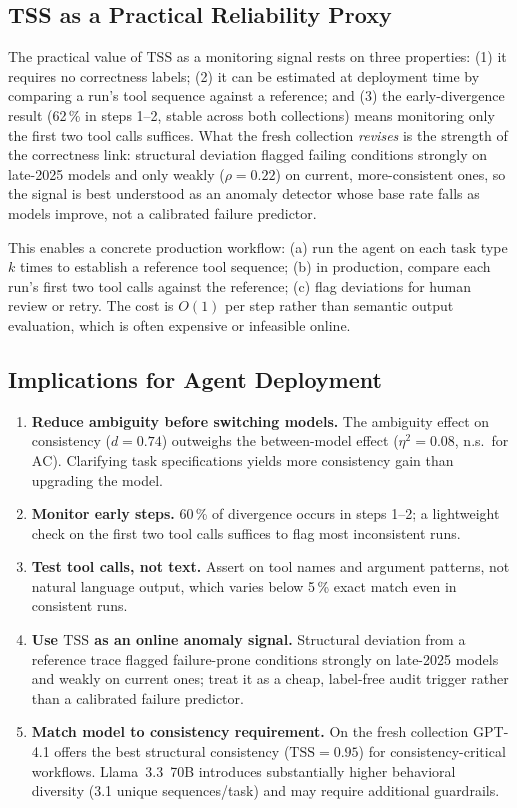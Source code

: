 \documentclass[11pt]{article}
\newcommand{\tss}{\mathrm{TSS}}
\newcommand{\ac}{\mathrm{AC}}
\begin{document}
\subsection{TSS as a Practical Reliability Proxy}
\label{sec:tss_proxy}

The practical value of $\tss$ as a monitoring signal rests on three
properties: (1) it requires no correctness labels; (2) it can be estimated at
deployment time by comparing a run's tool sequence against a reference; and
(3) the early-divergence result (62\,\% in steps 1--2, stable across both
collections) means monitoring only the first two tool calls suffices. What the
fresh collection \emph{revises} is the strength of the correctness link:
structural deviation flagged failing conditions strongly on late-2025 models
and only weakly ($\rho = 0.22$) on current, more-consistent ones, so the
signal is best understood as an anomaly detector whose base rate falls as
models improve, not a calibrated failure predictor.

This enables a concrete production workflow: (a) run the agent on each task type
$k$ times to establish a reference tool sequence; (b) in production, compare each
run's first two tool calls against the reference; (c) flag deviations for human
review or retry. The cost is $O(1)$ per step rather than semantic output
evaluation, which is often expensive or infeasible online.

\subsection{Implications for Agent Deployment}
\label{sec:implications}

\begin{enumerate}[leftmargin=1.5em]
  \item \textbf{Reduce ambiguity before switching models.} The ambiguity effect on
    consistency ($d = 0.74$) outweighs the between-model effect ($\eta^2 = 0.08$,
    n.s.\ for $\ac$). Clarifying task specifications yields more consistency gain
    than upgrading the model.
  \item \textbf{Monitor early steps.} 60\,\% of divergence occurs in steps 1--2;
    a lightweight check on the first two tool calls suffices to flag most
    inconsistent runs.
  \item \textbf{Test tool calls, not text.} Assert on tool names and argument
    patterns, not natural language output, which varies below 5\,\% exact match
    even in consistent runs.
  \item \textbf{Use $\tss$ as an online anomaly signal.} Structural deviation
    from a reference trace flagged failure-prone conditions strongly on
    late-2025 models and weakly on current ones; treat it as a cheap,
    label-free audit trigger rather than a calibrated failure predictor.
  \item \textbf{Match model to consistency requirement.} On the fresh
    collection GPT-4.1 offers the best structural consistency
    ($\tss = 0.95$) for consistency-critical workflows. Llama~3.3~70B
    introduces substantially higher behavioral diversity (3.1 unique
    sequences/task) and may require additional guardrails.
\end{enumerate}
\end{document}
